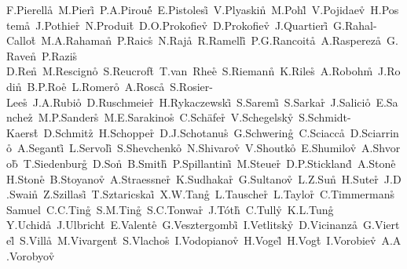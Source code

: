 \documentclass[12pt,a4paper,dvips]{article}
\begin{document}
{F.Pierella\r\tute\bologna\ 
M.Pieri\r\tute{\florence}\
P.A.Pirou\'e\r\tute\prince\ 
E.Pistolesi\r\tute\milan\
V.Plyaskin\r\tute\moscow\ 
M.Pohl\r\tute\geneva\ 
V.Pojidaev\r\tute{\moscow,\florence}\
H.Postema\r\tute\mit\
J.Pothier\r\tute\cern\
N.Produit\r\tute\geneva\
D.O.Prokofiev\r\tute\purdue\ 
D.Prokofiev\r\tute\peters\ 
J.Quartieri\r\tute\salerno\
G.Rahal-Callot\r\tute{\eth,\cern}\
M.A.Rahaman\r\tute\tata\ 
P.Raics\r\tute\debrecen\ 
N.Raja\r\tute\tata\
R.Ramelli\r\tute\eth\ 
P.G.Rancoita\r\tute\milan\
A.Raspereza\r\tute\zeuthen\ 
G.Raven\r\tute\ucsd\
P.Razis\r\tute\cyprus
D.Ren\r\tute\eth\ 
M.Rescigno\r\tute\rome\
S.Reucroft\r\tute\ne\
T.van~Rhee\r\tute\utrecht\
S.Riemann\r\tute\zeuthen\
K.Riles\r\tute\mich\
A.Robohm\r\tute\eth\
J.Rodin\r\tute\alabama\
B.P.Roe\r\tute\mich\
L.Romero\r\tute\madrid\ 
A.Rosca\r\tute\berlin\ 
S.Rosier-Lees\r\tute\lapp\ 
J.A.Rubio\r\tute{\cern}\ 
D.Ruschmeier\r\tute\berlin\
H.Rykaczewski\r\tute\eth\ 
S.Saremi\r\tute\lsu\ 
S.Sarkar\r\tute\rome\
J.Salicio\r\tute{\cern}\ 
E.Sanchez\r\tute\cern\
M.P.Sanders\r\tute\nymegen\
M.E.Sarakinos\r\tute\seft\
C.Sch{\"a}fer\r\tute\cern\
V.Schegelsky\r\tute\peters\
S.Schmidt-Kaerst\r\tute\aachen\
D.Schmitz\r\tute\aachen\ 
H.Schopper\r\tute\hamburg\
D.J.Schotanus\r\tute\nymegen\
G.Schwering\r\tute\aachen\ 
C.Sciacca\r\tute\naples\
D.Sciarrino\r\tute\geneva\ 
A.Seganti\r\tute\bologna\ 
L.Servoli\r\tute\perugia\
S.Shevchenko\r\tute{\caltech}\
N.Shivarov\r\tute\sofia\
V.Shoutko\r\tute\moscow\ 
E.Shumilov\r\tute\moscow\ 
A.Shvorob\r\tute\caltech\
T.Siedenburg\r\tute\aachen\
D.Son\r\tute\korea\
B.Smith\r\tute\cmu\
P.Spillantini\r\tute\florence\ 
M.Steuer\r\tute{\mit}\
D.P.Stickland\r\tute\prince\ 
A.Stone\r\tute\lsu\ 
H.Stone\r\tute{\prince,\dag}\ 
B.Stoyanov\r\tute\sofia\
A.Straessner\r\tute\aachen\
K.Sudhakar\r\tute{\tata}\
G.Sultanov\r\tute\wl\
L.Z.Sun\r\tute{\hefei}\
H.Suter\r\tute\eth\ 
J.D.Swain\r\tute\wl\
Z.Szillasi\r\tute{\alabama,\P}\
T.Sztaricskai\r\tute{\alabama,\P}\ 
X.W.Tang\r\tute\beijing\
L.Tauscher\r\tute\basel\
L.Taylor\r\tute\ne\
C.Timmermans\r\tute\nymegen\
Samuel~C.C.Ting\r\tute\mit\ 
S.M.Ting\r\tute\mit\ 
S.C.Tonwar\r\tute\tata\ 
J.T\'oth\r\tute{\budapest}\ 
C.Tully\r\tute\cern\
K.L.Tung\r\tute\beijing
Y.Uchida\r\tute\mit\
J.Ulbricht\r\tute\eth\ 
E.Valente\r\tute\rome\ 
G.Vesztergombi\r\tute\budapest\
I.Vetlitsky\r\tute\moscow\ 
D.Vicinanza\r\tute\salerno\ 
G.Viertel\r\tute\eth\ 
S.Villa\r\tute\ne\
M.Vivargent\r\tute{\lapp}\ 
S.Vlachos\r\tute\basel\
I.Vodopianov\r\tute\peters\ 
H.Vogel\r\tute\cmu\
H.Vogt\r\tute\zeuthen\ 
I.Vorobiev\r\tute{\moscow}\ 
A.A.Vorobyov\r\tute\peters\ 
}
\end{document}

